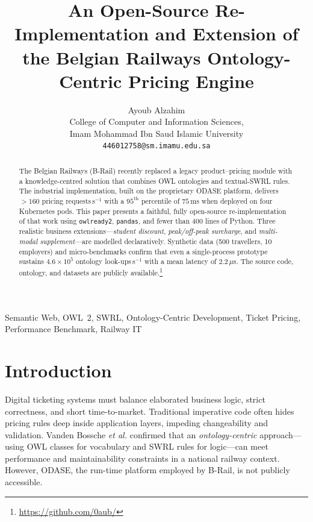 \documentclass[lettersize,journal]{IEEEtran}
\begin{document}
\title{An Open-Source Re-Implementation and Extension of the Belgian Railways Ontology-Centric Pricing Engine}

\author{Ayoub Alzahim\\
College of Computer and Information Sciences,\\
Imam Mohammad Ibn Saud Islamic University\\
\texttt{446012758@sm.imamu.edu.sa}}


\maketitle

\begin{abstract}
\boldmath
The Belgian Railways (B-Rail) recently replaced a legacy product–pricing module with a knowledge-centred solution that combines OWL ontologies and textual-SWRL rules.  
The industrial implementation, built on the proprietary ODAS\!E platform, delivers $>160$ pricing requests\,s$^{-1}$ with a $95^{\text{th}}$ percentile of $75$\,ms when deployed on four Kubernetes pods.  
This paper presents a faithful, fully open-source re-implementation of that work using \texttt{owlready2}, \texttt{pandas}, and fewer than 400 lines of Python.  
Three realistic business extensions—\emph{student discount}, \emph{peak/off-peak surcharge}, and \emph{multi-modal supplement}—are modelled declaratively.  
Synthetic data (500 travellers, 10 employers) and micro-benchmarks confirm that even a single-process prototype sustains \mbox{$4.6\times10^{5}$} ontology look-ups\,s$^{-1}$ with a mean latency of $2.2\,\mu$s.  
The source code, ontology, and datasets are publicly available.\footnote{\url{https://github.com/0aub/}}
\end{abstract}

\begin{IEEEkeywords}
Semantic Web, OWL~2, SWRL, Ontology-Centric Development, Ticket Pricing, Performance Benchmark, Railway IT
\end{IEEEkeywords}

\section{Introduction}
Digital ticketing systems must balance elaborated business logic, strict correctness, and short time-to-market.  
Traditional imperative code often hides pricing rules deep inside application layers, impeding changeability and validation.  
Vanden Bossche \textit{et al.} \cite{ruleml24} confirmed that an \emph{ontology-centric} approach—using OWL classes for vocabulary and SWRL rules for logic—can meet performance and maintainability constraints in a national railway context.  
However, ODAS\!E, the run-time platform employed by B-Rail, is not publicly accessible.
\end{document}
